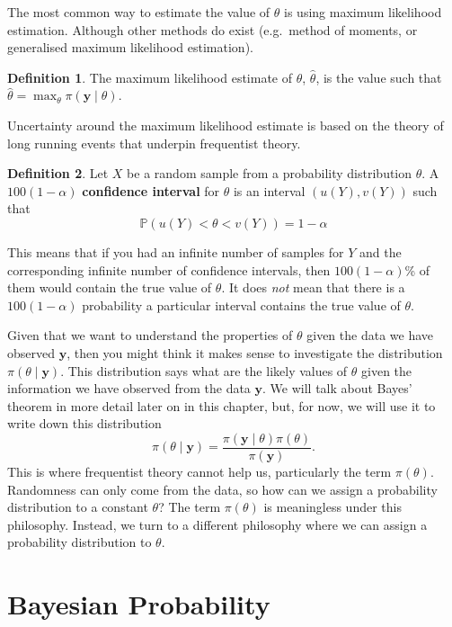\documentclass[
]{book}
\theoremstyle{definition}
\newtheorem{definition}{Definition}[chapter]
\theoremstyle{definition}
\theoremstyle{definition}
\theoremstyle{definition}
\theoremstyle{remark}
\begin{document}
The most common way to estimate the value of \(\theta\) is using maximum likelihood estimation. Although other methods do exist (e.g.~method of moments, or generalised maximum likelihood estimation).

\begin{definition}
The maximum likelihood estimate of \(\theta\), \(\hat{\theta}\), is the value such that \(\hat{\theta} = \max_{\theta} \pi(\boldsymbol{y}\mid \theta)\).
\end{definition}

Uncertainty around the maximum likelihood estimate is based on the theory of long running events that underpin frequentist theory.

\begin{definition}
Let \(X\) be a random sample from a probability distribution \(\theta\). A \(100(1-\alpha)%
\) \textbf{confidence interval} for \(\theta\) is an interval \((u(Y), v(Y))\) such that
\[
\mathbb{P}(u(Y) < \theta < v(Y)) = 1-\alpha
\]
\end{definition}

This means that if you had an infinite number of samples for \(Y\) and the corresponding infinite number of confidence intervals, then \(100(1-\alpha)\)\% of them would contain the true value of \(\theta\). It does \emph{not} mean that there is a \(100(1-\alpha)\) probability a particular interval contains the true value of \(\theta\).

Given that we want to understand the properties of \(\theta\) given the data we have observed \(\boldsymbol{y}\), then you might think it makes sense to investigate the distribution \(\pi(\theta \mid \boldsymbol{y})\). This distribution says what are the likely values of \(\theta\) given the information we have observed from the data \(\boldsymbol{y}\). We will talk about Bayes' theorem in more detail later on in this chapter, but, for now, we will use it to write down this distribution
\[
\pi(\theta \mid \boldsymbol{y}) = \frac{\pi(\boldsymbol{y} \mid \theta)\pi(\theta)}{\pi(\boldsymbol{y})}. 
\]
This is where frequentist theory cannot help us, particularly the term \(\pi(\theta)\). Randomness can only come from the data, so how can we assign a probability distribution to a constant \(\theta\)? The term \(\pi(\theta)\) is meaningless under this philosophy. Instead, we turn to a different philosophy where we can assign a probability distribution to \(\theta\).

\hypertarget{bayesian-probability}{%
\section{Bayesian Probability}\label{bayesian-probability}}
\end{document}
